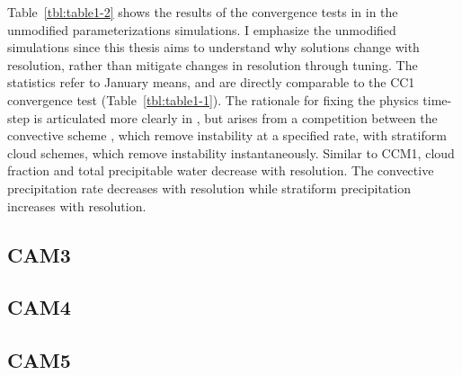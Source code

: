 Table~\ref{tbl:table1-2} shows the results of the convergence tests in \cite{WETAL1995CD} in the unmodified parameterizations simulations. I emphasize the unmodified simulations since this thesis aims to understand why solutions change with resolution, rather than mitigate changes in resolution through tuning. The statistics refer to January means, and are directly comparable to the CC1 convergence test (Table~\ref{tbl:table1-1}). The rationale for fixing the physics time-step is articulated more clearly in \cite{W2013QJRMS}, but arises from a competition between the convective scheme \citep[i.e.,;][]{H1994JGR}, which remove instability at a specified rate, with stratiform cloud schemes, which remove instability instantaneously. Similar to CCM1, cloud fraction and total precipitable water decrease with resolution. The convective precipitation rate decreases with resolution while stratiform precipitation increases with resolution.

\subsection{CAM3}
\subsection{CAM4}
\subsection{CAM5}